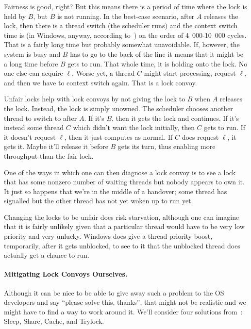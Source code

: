 Fairness is good, right? But this means there is a period of time where the lock is held by $B$, but $B$ is not running. In the best-case scenario, after $A$ releases the lock, then there is a thread switch (the scheduler runs) and the context switch time is (in Windows, anyway, according to~\cite{anticonvoy}) on the order of 4~000-10~000 cycles. That is a fairly long time but probably somewhat unavoidable. If, however, the system is busy and $B$ has to go to the back of the line it means that it might be a long time before $B$ gets to run. That whole time, it is holding onto the lock. No one else can acquire $\ell$. Worse yet, a thread $C$ might start processing, request $\ell$, and then we have to context switch again. That is a lock convoy.

Unfair locks help with lock convoys by not giving the lock to $B$ when $A$ releases the lock. Instead, the lock is simply unowned. The scheduler chooses another thread to switch to after $A$. If it's $B$, then it gets the lock and continues. If it's instead some thread $C$ which didn't want the lock initially, then $C$ gets to run. If it doesn't request $\ell$, then it just computes as normal. If $C$ does request $\ell$, it gets it. Maybe it'll release it before $B$ gets its turn, thus enabling more throughput than the fair lock.

One of the ways in which one can then diagnose a lock convoy is to see a lock that has some nonzero number of waiting threads but nobody appears to own it. It just so happens that we're in the middle of a handover; some thread has signalled but the other thread has not yet woken up to run yet.

Changing the locks to be unfair does risk starvation, although one can imagine that it is fairly unlikely given that a particular thread would have to be very low priority and very unlucky. Windows does give a thread priority boost, temporarily, after it gets unblocked, to see to it that the unblocked thread does actually get a chance to run.

\paragraph{Mitigating Lock Convoys Ourselves.} Although it can be nice to be able to give away such a problem to the OS developers and say ``please solve this, thanks'', that might not be realistic and we might have to find a way to work around it. We'll consider four solutions from~\cite{lockconvoys}: Sleep, Share, Cache, and Trylock.

